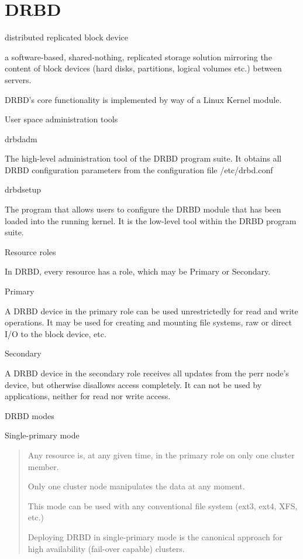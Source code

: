 \chapter{DRBD}
\label{chap:drbd}

distributed replicated block device

a software-based, shared-nothing, replicated storage solution
mirroring the content of block devices (hard disks, partitions,
logical volumes etc.) between servers.

DRBD's core functionality is implemented by way of a Linux Kernel
module.

User space administration tools

drbdadm

The high-level administration tool of the DRBD program suite. It
obtains all DRBD configuration parameters from the configuration 
file /etc/drbd.conf

drbdsetup

The program that allows users to configure the DRBD module that has
been loaded into the running kernel. It is the low-level tool within
the DRBD program suite.

Resource roles

In DRBD, every resource has a role, which may be Primary or Secondary.

Primary

A DRBD device in the primary role can be used unrestrictedly for read
and write operations. It may be used for creating and mounting file
systems, raw or direct I/O to the block device, etc.

Secondary

A DRBD device in the secondary role receives all updates from the perr
node's device, but otherwise disallows access completely.  It can not
be used by applications, neither for read nor write access.

DRBD modes

Single-primary mode
\begin{quote}
Any resource is, at any given time, in the primary role on only one
cluster member.

Only one cluster node manipulates the data at any moment.

This mode can be used with any conventional file system (ext3, ext4,
XFS, etc.)

Deploying DRBD in single-primary mode is the canonical approach for
high availability (fail-over capable) clusters.
\end{quote}

